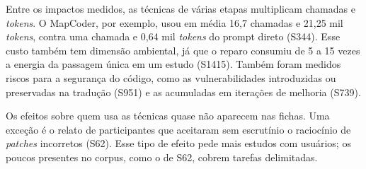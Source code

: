 Entre os impactos medidos, as técnicas de várias etapas multiplicam chamadas e \textit{tokens}. O MapCoder, por
exemplo, usou em média 16,7 chamadas e 21,25 mil \textit{tokens}, contra uma chamada e 0,64 mil \textit{tokens} do
prompt direto (S344).
Esse custo também tem dimensão ambiental, já que o reparo consumiu de 5 a 15 vezes a energia da passagem única em
um estudo (S1415). Também foram medidos riscos para a segurança do código, como as vulnerabilidades introduzidas
ou preservadas na tradução (S951) e as acumuladas em iterações de melhoria (S739).

Os efeitos sobre quem usa as técnicas quase não aparecem nas fichas. Uma exceção é o relato de participantes que
aceitaram sem escrutínio o raciocínio de \textit{patches} incorretos (S62).
Esse tipo de efeito pede mais estudos com usuários; os poucos presentes no corpus, como o de S62, cobrem tarefas
delimitadas.

